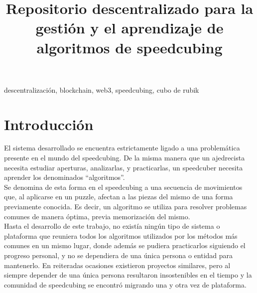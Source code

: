

\graphicspath{ {./img/} }

\title{Repositorio descentralizado para la gestión y el aprendizaje de algoritmos de speedcubing}


\titulo

\begin{multicols}{2}



{\footnotesize
descentralización, blockchain, web3, speedcubing, cubo de rubik
\par}

\section{Introducción}

El sistema desarrollado se encuentra estrictamente ligado a una problemática presente en el mundo del speedcubing. De la misma manera que un ajedrecista necesita estudiar aperturas, analizarlas, y practicarlas, un speedcuber necesita aprender los denominados ``algoritmos''.\\

Se denomina de esta forma en el speedcubing a una secuencia de movimientos que, al aplicarse en un puzzle, afectan a las piezas del mismo de una forma previamente conocida. Es decir, un algoritmo se utiliza para resolver problemas comunes de manera óptima, previa memorización del mismo.\\

Hasta el desarrollo de este trabajo, no existía ningún tipo de sistema o plataforma que reuniera todos los algoritmos utilizados por los métodos más comunes en un mismo lugar, donde además se pudiera practicarlos siguiendo el progreso personal, y no se dependiera de una única persona o entidad para mantenerlo.
En reiteradas ocasiones existieron proyectos similares, pero al siempre depender de una única persona resultaron insostenibles en el tiempo y la comunidad de speedcubing se encontró migrando una y otra vez de plataforma.\\


\end{multicols}
